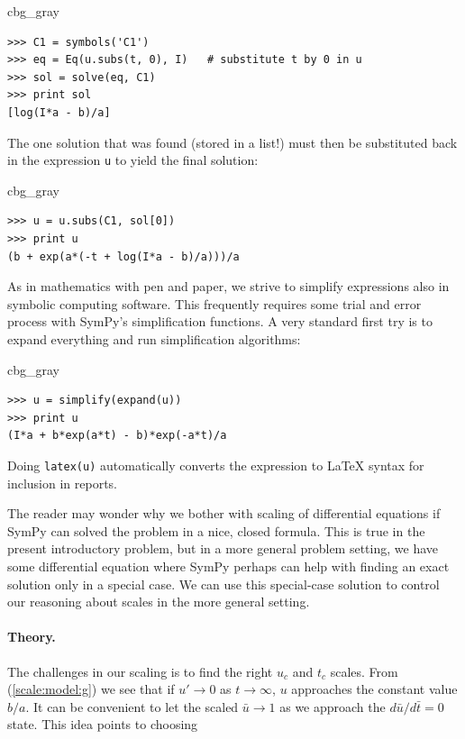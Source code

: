 \documentclass[graybox,envcountchap,sectrefs,final]{svmonodo}
\newenvironment{_cod_tight}[1]{
   \def\FrameCommand{\colorbox{#1}}
   \FrameRule0.6pt\MakeFramed {\FrameRestore}\vskip3mm}
   {\vskip0mm\endMakeFramed}
\newenvironment{cod}[1]{
\bgroup\rmfamily
\fboxsep=0mm\relax
\begin{_cod_tight}{#1}
\list{}{\parsep=-2mm\parskip=0mm\topsep=0pt\leftmargin=2mm
\rightmargin=2\leftmargin\leftmargin=4pt\relax}
\item\relax}
{\endlist\end{_cod_tight}\egroup}
\newenvironment{notice_mdfboxadmon}[1][]{
\begin{notice_mdfboxmdframed}[frametitle=#1]
}
{
\end{notice_mdfboxmdframed}
}
\begin{document}
\begin{notice_mdfboxadmon}
\begin{cod}{cbg_gray}\begin{Verbatim}[numbers=none,fontsize=\fontsize{9pt}{9pt},baselinestretch=0.95,xleftmargin=2mm]
>>> C1 = symbols('C1')
>>> eq = Eq(u.subs(t, 0), I)   # substitute t by 0 in u
>>> sol = solve(eq, C1)
>>> print sol
[log(I*a - b)/a]
\end{Verbatim}
\end{cod}
\noindent
The one solution that was found (stored in a list!)
must then be substituted back in the
expression \texttt{u} to yield the final solution:

\begin{cod}{cbg_gray}\begin{Verbatim}[numbers=none,fontsize=\fontsize{9pt}{9pt},baselinestretch=0.95,xleftmargin=2mm]
>>> u = u.subs(C1, sol[0])
>>> print u
(b + exp(a*(-t + log(I*a - b)/a)))/a
\end{Verbatim}
\end{cod}
\noindent
As in mathematics with pen and paper, we strive to simplify
expressions also in symbolic computing software.
This frequently requires some trial and error
process with SymPy's simplification functions. A very standard
first try is to expand everything and run simplification algorithms:

\begin{cod}{cbg_gray}\begin{Verbatim}[numbers=none,fontsize=\fontsize{9pt}{9pt},baselinestretch=0.95,xleftmargin=2mm]
>>> u = simplify(expand(u))
>>> print u
(I*a + b*exp(a*t) - b)*exp(-a*t)/a
\end{Verbatim}
\end{cod}
\noindent
Doing \texttt{latex(u)} automatically converts the expression to {\LaTeX} syntax
for inclusion in reports.
\end{notice_mdfboxadmon}



The reader may wonder why we bother with scaling of differential
equations if SymPy can solved the problem in a nice, closed
formula. This is true in the present introductory problem, but in a
more general problem setting, we have some differential equation where
SymPy perhaps can help with finding an exact solution only in a
special case. We can use this special-case solution to control our
reasoning about scales in the more general setting.

\paragraph{Theory.}
The challenges in our scaling is to find the right $u_c$ and $t_c$
scales. From (\ref{scale:model:g}) we see that if $u'\rightarrow 0$
as $t\rightarrow\infty$, $u$ approaches the constant value $b/a$. It can be
convenient to let the scaled $\bar u\rightarrow 1$ as
we approach the $d\bar u/d\bar t = 0$ state. This idea points to choosing
\end{document}
